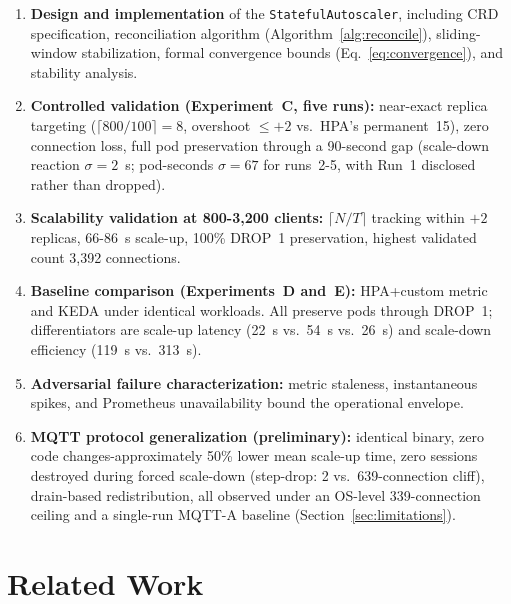 \documentclass[3p,twocolumn]{elsarticle}
\theoremstyle{plain}%
\theoremstyle{definition}%
\begin{document}
\begin{enumerate}[leftmargin=*]
\item \textbf{Design and implementation} of the \texttt{StatefulAutoscaler}, including CRD specification, reconciliation algorithm (Algorithm~\ref{alg:reconcile}), sliding-window stabilization, formal convergence bounds (Eq.~\ref{eq:convergence}), and stability analysis.

\item \textbf{Controlled validation (Experiment~C, five runs):} near-exact replica targeting ($\lceil800/100\rceil = 8$, overshoot $\leq +2$ vs.\ HPA's permanent~15), zero connection loss, full pod preservation through a 90-second gap (scale-down reaction $\sigma = 2$~s; pod-seconds $\sigma = 67$ for runs~2-5, with Run~1 disclosed rather than dropped).

\item \textbf{Scalability validation at 800-3{,}200 clients:} $\lceil N/T \rceil$ tracking within $+2$ replicas, 66-86~s scale-up, 100\% DROP~1 preservation, highest validated count 3{,}392 connections.

\item \textbf{Baseline comparison (Experiments~D and~E):} HPA+custom metric and KEDA under identical workloads. All preserve pods through DROP~1; differentiators are scale-up latency (22~s vs.\ 54~s vs.\ 26~s) and scale-down efficiency (119~s vs.\ 313~s).

\item \textbf{Adversarial failure characterization:} metric staleness, instantaneous spikes, and Prometheus unavailability bound the operational envelope.

\item \textbf{MQTT protocol generalization (preliminary):} identical binary, zero code changes-approximately 50\% lower mean scale-up time, zero sessions destroyed during forced scale-down (step-drop: 2 vs.\ 639-connection cliff), drain-based redistribution, all observed under an OS-level 339-connection ceiling and a single-run MQTT-A baseline (Section~\ref{sec:limitations}).
\end{enumerate}





\section{Related Work}
\label{sec:related}
\end{document}
